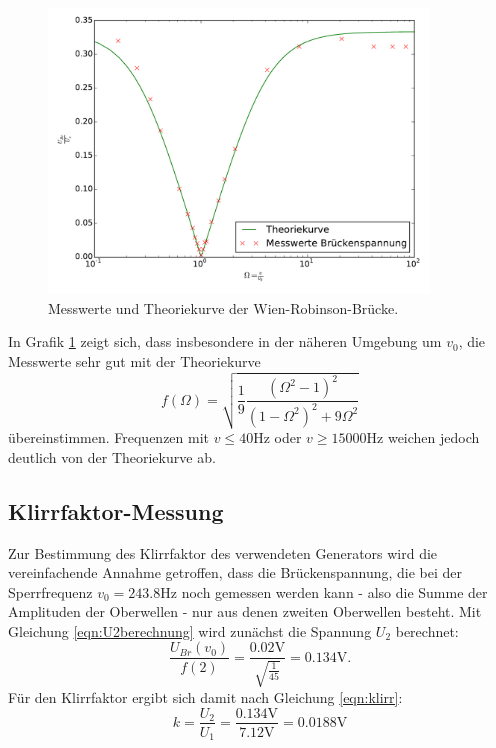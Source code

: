 \begin{figure}
  \centering
  \includegraphics[width=0.9\textwidth]{wien-robinson.pdf}
  \caption{Messwerte und Theoriekurve der Wien-Robinson-Brücke.}
  \label{fig:wien-robinson}
\end{figure}
In Grafik \ref{fig:wien-robinson} zeigt sich, dass insbesondere in der näheren
Umgebung um $v_0$, die Messwerte sehr gut mit der Theoriekurve
\begin{equation}
f(\Omega)=\sqrt{\frac{1}{9}\frac{(\Omega^2-1)^2}
{(1-\Omega^2)^2+9\Omega^2}}
\end{equation}
 übereinstimmen.
Frequenzen mit $v \leq 40 \si{\hertz}$ oder $v \geq 15000 \si{\hertz}$ weichen
jedoch deutlich von der Theoriekurve ab.

\subsection{Klirrfaktor-Messung}
Zur Bestimmung des Klirrfaktor des verwendeten Generators wird die vereinfachende
Annahme getroffen, dass die Brückenspannung, die bei der Sperrfrequenz
$v_0=243.8 \si{\hertz}$ noch gemessen werden kann - also die Summe der Amplituden
der  Oberwellen - nur aus denen zweiten Oberwellen besteht.
Mit Gleichung \eqref{eqn:U2berechnung} wird zunächst die Spannung $U_2$ berechnet:
\begin{equation*}
  \frac{U_{Br}(v_0)}{f(2)} = \frac{0.02\si{\volt}}{\sqrt{\frac{1}{45}}} = 0.134 \si{\volt}.
  \label{eqn:U2}
\end{equation*}
Für den Klirrfaktor ergibt sich damit nach Gleichung \eqref{eqn:klirr}:
\begin{equation*}
  k = \frac{U_2}{U_1} = \frac{0.134 \si{\volt}}{7.12\si{\volt}} = 0.0188 \si{\volt}
  \label{eqn:klirrfaktor_berechnung}
\end{equation*}
